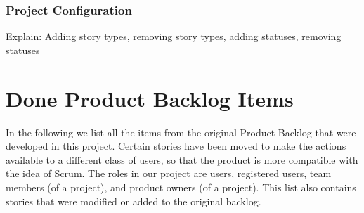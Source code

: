 \documentclass[
	accentcolor=tud1a %
]{tudreport}
\begin{document}
\subsection{Project Configuration}
\label{sec:proj-config}

Explain: Adding story types, removing story types, adding statuses, removing statuses

\chapter{Done Product Backlog Items}
\label{ch:done-pbis}

In the following we list all the items from the original Product Backlog that were developed in this project. Certain stories have been moved to make the actions available to a different class of users, so that the product is more compatible with the idea of Scrum. The roles in our project are users, registered users, team members (of a project), and product owners (of a project). This list also contains stories that were modified or added to the original backlog.

\end{document}

